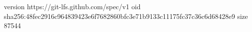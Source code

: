 version https://git-lfs.github.com/spec/v1
oid sha256:48fec2916c964839423e6f7682860bfc3e71b9133c11175fc37c36c6d68428e9
size 87544
